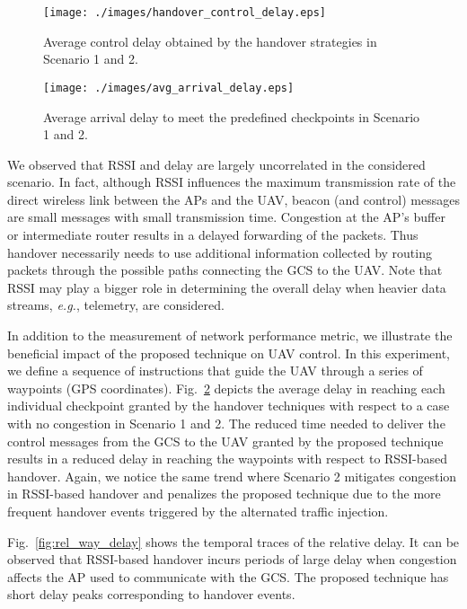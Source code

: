 \begin{figure}[!t]
\centering   \texttt{[image: ./images/handover\_control\_delay.eps]}
\vspace{-5mm}
\caption{Average control delay obtained by the handover strategies in Scenario 1 and 2.}
\vspace{-2mm}
\label{fig:handover_delay}
\end{figure}
\begin{figure}[t]
\centering   \texttt{[image: ./images/avg\_arrival\_delay.eps]}
\vspace{-5mm}
\caption{Average arrival delay to meet the predefined checkpoints in Scenario 1 and 2.}
\vspace{-6mm}
\label{fig:relative_delay}
\end{figure} 
We observed that RSSI and delay are largely uncorrelated in the considered scenario. In fact, although RSSI influences the maximum transmission rate of the direct wireless link between the APs and the UAV, beacon (and control) messages are small messages with small transmission time. Congestion at the AP's buffer or intermediate router results in a delayed forwarding of the packets. Thus handover necessarily needs to use additional information collected by routing packets through the possible paths connecting the GCS to the UAV. Note that RSSI may play a bigger role in determining the overall delay when heavier data streams, \emph{e.g.}, telemetry, are considered.

In addition to the measurement of network performance metric, we illustrate the beneficial impact of the proposed technique on UAV control. In this experiment, we define a sequence of instructions that guide the UAV through a series of waypoints (GPS coordinates).
Fig.~\ref{fig:relative_delay} depicts the average delay in reaching each individual checkpoint granted by the handover techniques with respect to a case with no congestion in Scenario 1 and 2. The reduced time needed to deliver the control messages from the GCS to the UAV granted by the proposed technique results in a reduced delay in reaching the waypoints with respect to RSSI-based handover. Again, we notice the same trend where Scenario 2 mitigates congestion in RSSI-based handover and penalizes the proposed technique due to the more frequent handover events triggered by the alternated traffic injection.



Fig.~\ref{fig:rel_way_delay} shows the temporal traces of the relative delay. It can be observed that RSSI-based handover incurs periods of large delay when congestion affects the AP used to communicate with the GCS. The proposed technique has short delay peaks corresponding to handover events.